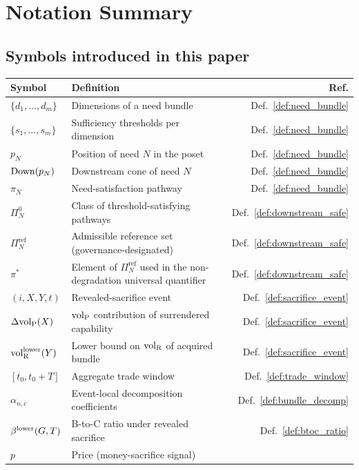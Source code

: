\section{Notation Summary}
\label{app:notation}

\subsection{Symbols introduced in this paper}

\begin{center}
\small
\begin{tabular}{@{}llr@{}}
\toprule
\textbf{Symbol} & \textbf{Definition} & \textbf{Ref.} \\
\midrule
$\{d_1,\ldots,d_m\}$ & Dimensions of a need bundle
  & Def.~\ref{def:need_bundle} \\
$\{s_1,\ldots,s_m\}$ & Sufficiency thresholds per dimension
  & Def.~\ref{def:need_bundle} \\
$p_N$ & Position of need $N$ in the poset
  & Def.~\ref{def:need_bundle} \\
$\mathrm{Down}(p_N)$ & Downstream cone of need $N$
  & Def.~\ref{def:need_bundle} \\
$\pi_N$ & Need-satisfaction pathway
  & Def.~\ref{def:need_bundle} \\
$\Pi_N^0$ & Class of threshold-satisfying pathways
  & Def.~\ref{def:downstream_safe} \\
$\Pi_N^{\mathrm{ref}}$ & Admissible reference set
  (governance-designated)
  & Def.~\ref{def:downstream_safe} \\
$\pi^*$ & Element of $\Pi_N^{\mathrm{ref}}$ used in the
  non-degradation universal quantifier
  & Def.~\ref{def:downstream_safe} \\
$(i, X, Y, t)$ & Revealed-sacrifice event
  & Def.~\ref{def:sacrifice_event} \\
$\Delta{\operatorname{vol}_{\mathrm{P}}}(X)$ & ${\operatorname{vol}_{\mathrm{P}}}$ contribution of surrendered capability
  & Def.~\ref{def:sacrifice_event} \\
${\operatorname{vol}_{\mathrm{R}}^{\mathrm{lower}}}(Y)$ & Lower bound on ${\operatorname{vol}_{\mathrm{R}}}$ of acquired bundle
  & Def.~\ref{def:sacrifice_event} \\
$[t_0, t_0 + T]$ & Aggregate trade window
  & Def.~\ref{def:trade_window} \\
$\alpha_{n,c}$ & Event-local decomposition coefficients
  & Def.~\ref{def:bundle_decomp} \\
$\beta^{\mathrm{lower}}(G, T)$ & B-to-C ratio under revealed sacrifice
  & Def.~\ref{def:btoc_ratio} \\
$p$ & Price (money-sacrifice signal)

\end{tabular}
\end{center}

